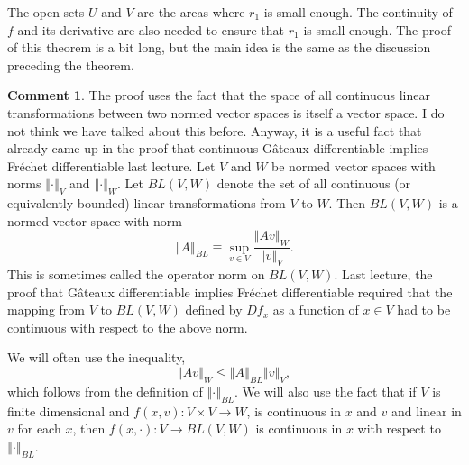 \documentclass[12pt,reqno]{amsart}
\theoremstyle{definition}
\newtheorem{remark}{Comment}[section]
\newcommand{\norm}[1]{\left\Vert {#1} \right\Vert}
\renewcommand{\to}{{\rightarrow}}
\begin{document}
The open sets $U$ and $V$ are the areas where $r_1$ is small
enough. The continuity of $f$ and its derivative are also needed to
ensure that $r_1$ is small enough. The proof of this theorem is a bit
long, but the main idea is the same as the discussion preceding the
theorem. 
\begin{remark}
  The proof uses the fact that the space of all continuous linear
  transformations between two normed vector spaces is itself a vector
  space. I do not think we have talked about this before. Anyway, it
  is a useful fact that already came up in the proof that continuous
  G\^{a}teaux differentiable implies Fr\'{e}chet differentiable last
  lecture. Let $V$ and $W$ be normed vector spaces with norms
  $\norm{\cdot}_V$ and $\norm{\cdot}_W$. Let $BL(V,W)$ denote the set
  of all continuous (or equivalently bounded) linear transformations
  from $V$ to $W$. Then $BL(V,W)$ is a normed vector space with norm
  \[ \norm{A}_{BL} \equiv \sup_{v \in V} \frac{\norm{Av}_W}{\norm{v}_V}. \]
  This is sometimes called the operator norm on $BL(V,W)$. Last
  lecture, the proof that G\^{a}teaux differentiable implies
  Fr\'{e}chet differentiable required that the mapping from $V$ to
  $BL(V,W)$ defined by $Df_x$ as a function of $x \in V$ had to be
  continuous with respect to the above norm. 

  We will often use the inequality,
  \[ \norm{Av}_W \leq \norm{A}_{BL} \norm{v}_V, \] which follows from
  the definition of $\norm{\cdot}_{BL}$. We will also use the fact
  that if $V$ is finite dimensional and $f(x,v): V \times V \to W$, is
  continuous in $x$ and $v$ and linear in $v$ for each $x$, then 
  $ f(x, \cdot):V \to BL(V,W)$ is continuous in $x$ with respect to
  $\norm{\cdot}_{BL}$. 
\end{remark}
\end{document}
